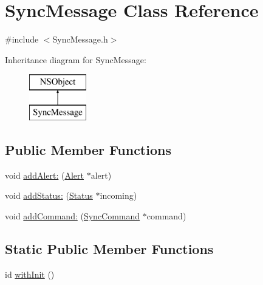 \hypertarget{interface_sync_message}{
\section{\-Sync\-Message \-Class \-Reference}
\label{interface_sync_message}
}


{\ttfamily \#include $<$\-Sync\-Message.\-h$>$}

\-Inheritance diagram for \-Sync\-Message\-:\begin{figure}[H]
\begin{center}
\leavevmode
\includegraphics[height=2.000000cm]{interface_sync_message}
\end{center}
\end{figure}
\subsection*{\-Public \-Member \-Functions}
\begin{DoxyCompactItemize}
\item 
void \hyperlink{interface_sync_message_a7ae4a9827fe02f11d1c0c1b19ca4ac28}{add\-Alert\-:} (\hyperlink{interface_alert}{\-Alert} $\ast$alert)
\item 
void \hyperlink{interface_sync_message_ac72485612a6f8e5012c6bd37b235d7be}{add\-Status\-:} (\hyperlink{interface_status}{\-Status} $\ast$incoming)
\item 
void \hyperlink{interface_sync_message_a8360483ce017b3636854d32de7be4199}{add\-Command\-:} (\hyperlink{interface_sync_command}{\-Sync\-Command} $\ast$command)
\end{DoxyCompactItemize}
\subsection*{\-Static \-Public \-Member \-Functions}
\begin{DoxyCompactItemize}
\item 
id \hyperlink{interface_sync_message_aeee6e93df685f35c19dd1517311b082a}{with\-Init} ()
\end{DoxyCompactItemize}
